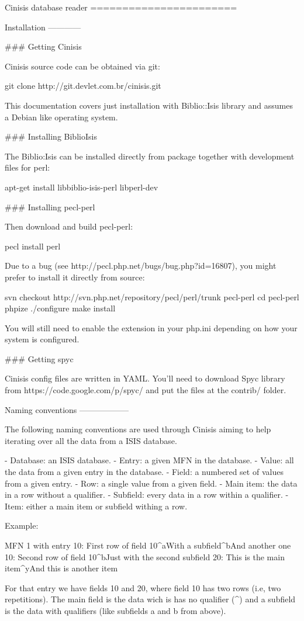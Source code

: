 \begin{DoxyVerbInclude}
Cinisis database reader
=======================

Installation
------------

### Getting Cinisis

Cinisis source code can be obtained via git:

    git clone http://git.devlet.com.br/cinisis.git

This documentation covers just installation with Biblio::Isis library
and assumes a Debian like operating system.

### Installing BiblioIsis

The Biblio:Isis can be installed directly from package together with
development files for perl:

    apt-get install libbiblio-isis-perl libperl-dev

### Installing pecl-perl

Then download and build pecl-perl:

    pecl install perl

Due to a bug (see http://pecl.php.net/bugs/bug.php?id=16807), you might
prefer to install it directly from source:

    svn checkout http://svn.php.net/repository/pecl/perl/trunk pecl-perl
    cd pecl-perl
    phpize
    ./configure
    make install

You will still need to enable the extension in your php.ini depending on
how your system is configured.

### Getting spyc

Cinisis config files are written in YAML. You'll need to download Spyc
library from https://code.google.com/p/spyc/ and put the files at
the contrib/ folder.

Naming conventions
------------------

The following naming conventions are used through Cinisis aiming to help
iterating over all the data from a ISIS database.

  - Database:  an ISIS database.
  - Entry:     a given MFN in the database.
  - Value:     all the data from a given entry in the database.
  - Field:     a numbered set of values from a given entry.
  - Row:       a single value from a given field.
  - Main item: the data in a row without a qualifier.
  - Subfield:  every data in a row within a qualifier.
  - Item:      either a main item or subfield withing a row.

Example:

    MFN 1 with entry
    10: First  row of field 10^aWith a subfield^bAnd another one
    10: Second row of field 10^bJust with the second subfield
    20: This is the main item^yAnd this is another item

For that entry we have fields 10 and 20, where field 10 has two rows (i.e, two
repetitions). The main field is the data wich is has no qualifier (^) and a
subfield is the data with qualifiers (like subfields a and b from above).
\end{DoxyVerbInclude}
 